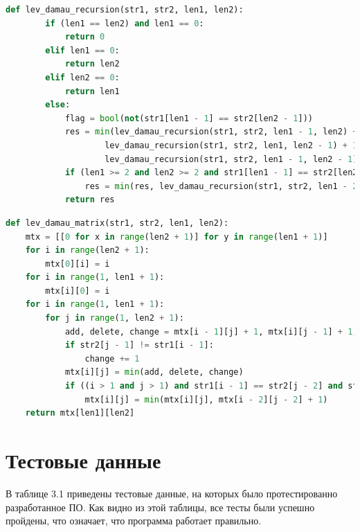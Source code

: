 \documentclass[12pt]{report}
\begin{document}
\begin{lstlisting}[label=some-code,caption=Функция нахождения расстояния Дамерау-Левенштейна рекурсивно,language=Python]
	def lev_damau_recursion(str1, str2, len1, len2):
		if (len1 == len2) and len1 == 0:
			return 0
		elif len1 == 0:
			return len2
		elif len2 == 0:
			return len1
		else:
			flag = bool(not(str1[len1 - 1] == str2[len2 - 1]))
			res = min(lev_damau_recursion(str1, str2, len1 - 1, len2) + 1,
					lev_damau_recursion(str1, str2, len1, len2 - 1) + 1,
					lev_damau_recursion(str1, str2, len1 - 1, len2 - 1) + flag)
			if (len1 >= 2 and len2 >= 2 and str1[len1 - 1] == str2[len2 - 2] and str1[len1 - 2] == str2[len2 - 1]):
				res = min(res, lev_damau_recursion(str1, str2, len1 - 2, len2 - 2) + 1)
			return res 
\end{lstlisting}

\newpage

\begin{lstlisting}[label=some-code,caption=Функция нахождения расстояния Дамерау-Левенштейна матрично,language=Python]
def lev_damau_matrix(str1, str2, len1, len2):
	mtx = [[0 for x in range(len2 + 1)] for y in range(len1 + 1)]
	for i in range(len2 + 1):
		mtx[0][i] = i
	for i in range(1, len1 + 1):
		mtx[i][0] = i
	for i in range(1, len1 + 1):
		for j in range(1, len2 + 1):
			add, delete, change = mtx[i - 1][j] + 1, mtx[i][j - 1] + 1, mtx[i - 1][j - 1]
			if str2[j - 1] != str1[i - 1]:
				change += 1
			mtx[i][j] = min(add, delete, change)
			if ((i > 1 and j > 1) and str1[i - 1] == str2[j - 2] and str1[i - 2] == str2[j - 1]):
				mtx[i][j] = min(mtx[i][j], mtx[i - 2][j - 2] + 1)
	return mtx[len1][len2]
\end{lstlisting}

\section{Тестовые данные}

В таблице 3.1 приведены тестовые данные, на которых было протестированно разработанное ПО. Как видно из этой таблицы, все тесты были успешно пройдены, что означает, что программа работает правильно.
\end{document}
